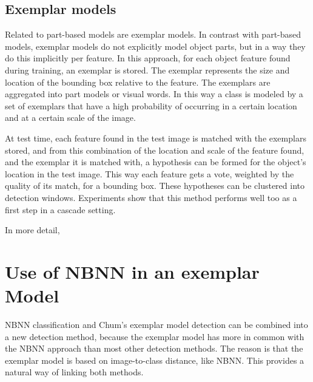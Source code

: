 \documentclass[a4paper,10pt]{article}
\begin{document}
\subsection{Exemplar models} %
\label{sub:exemplar_models}

Related to part-based models are exemplar models. \cite{leibe2004combined, chum2007exemplar} In contrast with part-based models, exemplar models do not explicitly model object parts, but in a way they do this implicitly per feature. In this approach, for each object feature found during training, an exemplar is stored. The exemplar represents the size and location of the bounding box relative to the feature. The exemplars are aggregated into part models\cite{leibe2004combined} or visual words\cite{chum2007exemplar}. In this way a class is modeled by a set of exemplars that have a high probability of occurring in a certain location and at a certain scale of the image.

At test time, each feature found in the test image is matched with the exemplars stored, and from this combination of the location and scale of the feature found, and the exemplar it is matched with, a hypothesis can be formed for the object's location in the test image. This way each feature gets a vote, weighted by the quality of its match, for a bounding box. These hypotheses can be clustered into detection windows. Experiments\cite{vedaldi2009multiple} show that this method performs well too as a first step in a cascade setting.

In more detail, 




\section{Use of NBNN in an exemplar Model} %
\label{sec:linking}

NBNN classification and Chum's exemplar model detection can be combined into a new detection method, because the exemplar model has more in common with the NBNN approach than most other detection methods. The reason is that the exemplar model is based on image-to-class distance, like NBNN. This provides a natural way of linking both methods.
\end{document}
